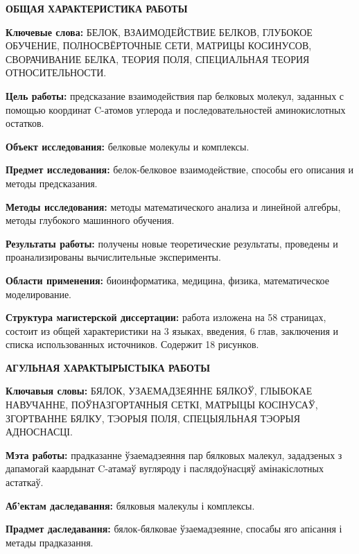 \newpage
{}

\begin{center}
	\textbf{\large ОБЩАЯ ХАРАКТЕРИСТИКА РАБОТЫ}
\end{center}


\textbf{Ключевые слова:} БЕЛОК, ВЗАИМОДЕЙСТВИЕ БЕЛКОВ, ГЛУБОКОЕ ОБУЧЕНИЕ, ПОЛНОСВЁРТОЧНЫЕ СЕТИ, МАТРИЦЫ КОСИНУСОВ, СВОРАЧИВАНИЕ БЕЛКА, ТЕОРИЯ ПОЛЯ, СПЕЦИАЛЬНАЯ ТЕОРИЯ ОТНОСИТЕЛЬНОСТИ.

\textbf{Цель работы:} предсказание взаимодействия пар белковых молекул, заданных с помощью координат C\textalpha-атомов углерода и последовательностей аминокислотных остатков.

\textbf{Объект исследования:} белковые молекулы и комплексы.

\textbf{Предмет исследования:} белок-белковое взаимодействие, способы его описания и методы предсказания.

\textbf{Методы исследования:} методы математического анализа и линейной алгебры, методы глубокого машинного обучения.

\textbf{Результаты работы:} получены новые теоретические результаты, проведены и проанализированы вычислительные эксперименты.

\textbf{Области применения:} биоинформатика, медицина, физика, математическое моделирование.

\textbf{Структура магистерской диссертации:} работа изложена на 58 страницах, состоит из общей характеристики на 3 языках, введения, 6 глав, заключения и списка использованных источников. Содержит 18 рисунков.

\newpage
{}
\begin{center}
	\textbf{\large АГУЛЬНАЯ ХАРАКТЫРЫСТЫКА РАБОТЫ}
\end{center}

\textbf{Ключавыя словы:} БЯЛОК, УЗАЕМАДЗЕЯННЕ БЯЛКОЎ, ГЛЫБОКАЕ НАВУЧАННЕ, ПОЎНАЗГОРТАЧНЫЯ СЕТКІ, МАТРЫЦЫ КОСІНУСАЎ, ЗГОРТВАННЕ БЯЛКУ, ТЭОРЫЯ ПОЛЯ, СПЕЦЫЯЛЬНАЯ ТЭОРЫЯ АДНОСНАСЦІ.

\textbf{Мэта работы:} прадказанне ўзаемадзеяння пар бялковых малекул, зададзеных з дапамогай каардынат C\textalpha-атамаў вугляроду і паслядоўнасцяў амінакіслотных астаткаў.

\textbf{Аб’ектам даследавання:} бялковыя малекулы і комплексы.

\textbf{Прадмет даследавання:} бялок-бялковае ўзаемадзеянне, спосабы яго апісання і метады прадказання.


